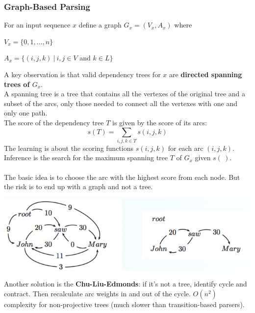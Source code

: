 \documentclass[10pt]{report}
\begin{document}
\subsubsection{Graph-Based Parsing}
For an input sequence $x$ define a graph $G_x=(V_x, A_x)$ where\begin{list}{}{}
	\item $V_x=\{0,1,\ldots,n\}$
	\item $A_x=\{(i,j,k)\:|\:i,j\in V$ and $k \in L\}$
\end{list}
A key observation is that valid dependency trees for $x$ are \textbf{directed spanning trees of $G_x$}.\\
A spanning tree is a tree that contains all the vertexes of the original tree and a subset of the arcs, only those needed to connect all the vertexes with one and only one path.\\
The score of the dependency tree $T$ is given by the score of its arcs:
$$s(T)=\sum_{i,j,k\in T} s(i,j,k)$$
The learning is about the scoring functions $s(i,j,k)$ for each arc $(i,j,k)$. Inference is the search for the maximum spanning tree $T$ of $G_x$ given $s(\:)$.\\\\
The basic idea is to choose the arc with the highest score from each node. But the risk is to end up with a graph and not a tree.
\begin{center}
	\includegraphics[scale=0.33]{45.png}
\end{center}
Another solution is the \textbf{Chu-Liu-Edmonds}: if it's not a tree, identify cycle and contract. Then recalculate arc weights in and out of the cycle. $O(n^2)$ complexity for non-projective trees (much slower than transition-based parsers).
\end{document}
